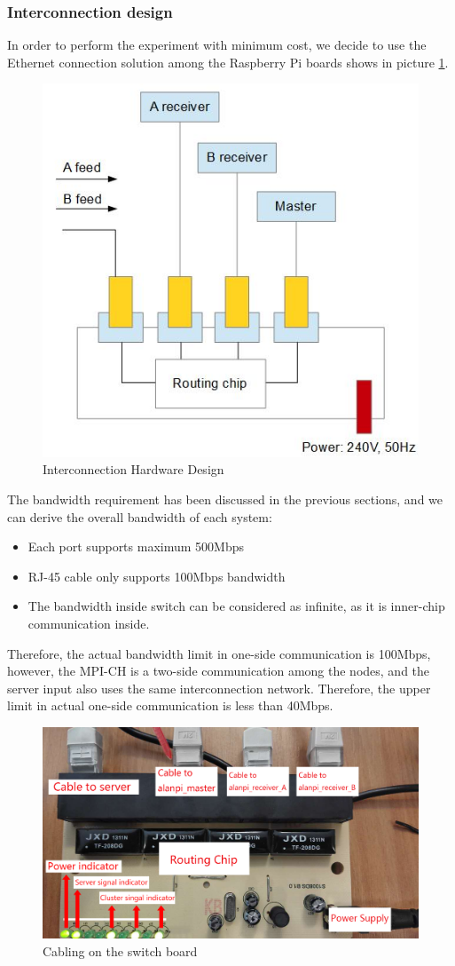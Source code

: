 \documentclass[11pt,openright,a4paper]{report}
\begin{document}
\subsubsection{Interconnection design}
In order to perform the experiment with minimum cost, we decide to use the Ethernet connection solution among the Raspberry Pi boards shows in picture \ref{fig:hardwareDesign}.\\  
\begin{figure}[H]
\centering
\includegraphics[width=0.5\linewidth]{picture/hardwareDesign}
\caption{Interconnection Hardware Design}
\label{fig:hardwareDesign}
\end{figure}
The bandwidth requirement has been discussed in the previous sections, and we can derive the overall bandwidth of each system:\\
\begin{itemize}
	\item Each port supports maximum 500Mbps
	\item RJ-45 cable only supports 100Mbps bandwidth\cite{kunz1999rj}
	\item The bandwidth inside switch can be considered as infinite, as it is inner-chip communication inside.
\end{itemize}
Therefore, the actual bandwidth limit in one-side communication is 100Mbps, however, the MPI-CH is a two-side communication among the nodes, and the server input also uses the same interconnection network. Therefore, the upper limit in actual one-side communication is less than 40Mbps.\\
\begin{figure}[H]
	\centering
	\includegraphics[width=0.5\linewidth]{picture/photo/SwitchConnection}
	\caption{Cabling on the switch board}
	\label{fig:SwitchConnection}
\end{figure}
\end{document}
